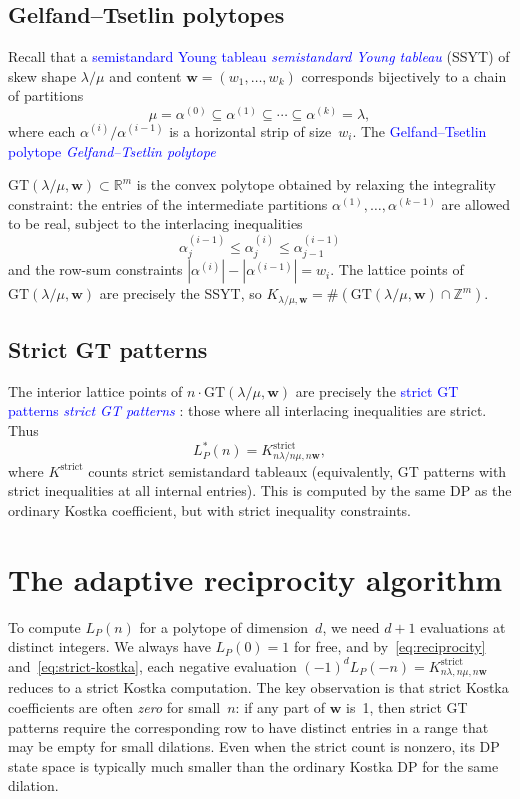 \documentclass[11pt,reqno]{amsart}
\theoremstyle{definition}
\newcommand{\setZ}{\mathbb{Z}}
\newcommand{\setR}{\mathbb{R}}
\newcommand{\GT}{\mathrm{GT}}
\newcommand{\lam}{\lambda}
\newcommand{\wt}{\mathbf{w}}
\newcommand{\Ehr}{L}
\newcommand{\Ehrstar}{L^{*}}
\newcommand{\defin}[1]{%
\relax\ifmmode%
\textcolor{blue}{#1}%
\else \textcolor{blue}{\emph{#1}}%
\fi%
}
\begin{document}
\subsection{Gelfand--Tsetlin polytopes}\label{subs:GTpolytopes}

Recall that a \defin{semistandard Young tableau} (SSYT) of skew shape
$\lam/\mu$ and content $\wt = (w_1, \dotsc, w_k)$ corresponds
bijectively to a chain of partitions
\[
  \mu = \alpha^{(0)} \subseteq \alpha^{(1)} \subseteq \dotsb
  \subseteq \alpha^{(k)} = \lam,
\]
where each $\alpha^{(i)} / \alpha^{(i-1)}$ is a horizontal strip
of size~$w_i$.  The \defin{Gelfand--Tsetlin polytope}
$\GT(\lam/\mu, \wt) \subset \setR^m$ is the convex polytope obtained
by relaxing the integrality constraint: the entries of the
intermediate partitions $\alpha^{(1)}, \dotsc, \alpha^{(k-1)}$ are
allowed to be real, subject to the interlacing inequalities
\[
  \alpha^{(i-1)}_j \leq \alpha^{(i)}_j \leq \alpha^{(i-1)}_{j-1}
\]
and the row-sum constraints
$|\alpha^{(i)}| - |\alpha^{(i-1)}| = w_i$.
The lattice points of $\GT(\lam/\mu, \wt)$ are precisely the SSYT,
so $K_{\lam/\mu, \wt} = \#(\GT(\lam/\mu, \wt) \cap \setZ^m)$.

\subsection{Strict GT patterns}\label{subs:strictGT}

The interior lattice points of $n \cdot \GT(\lam/\mu, \wt)$ are
precisely the \defin{strict GT patterns}: those where all interlacing
inequalities are strict.  Thus
\begin{equation}\label{eq:strict-kostka}
  \Ehrstar_P(n) = K^{\mathrm{strict}}_{n\lam/n\mu, n\wt},
\end{equation}
where $K^{\mathrm{strict}}$ counts strict semistandard tableaux
(equivalently, GT patterns with strict inequalities at all internal
entries).  This is computed by the same DP as the ordinary Kostka
coefficient, but with strict inequality constraints.


\section{The adaptive reciprocity algorithm}\label{sec:algorithm}

To compute $\Ehr_P(n)$ for a polytope of dimension~$d$, we need $d+1$
evaluations at distinct integers.  We always have $\Ehr_P(0) = 1$
for free, and by~\eqref{eq:reciprocity} and~\eqref{eq:strict-kostka},
each negative evaluation $(-1)^d \Ehr_P(-n) = K^{\mathrm{strict}}_{n\lam, n\mu, n\wt}$
reduces to a strict Kostka computation.  The key observation is that
strict Kostka coefficients are often \emph{zero} for small~$n$:
if any part of $\wt$ is~1, then strict GT patterns require the
corresponding row to have distinct entries in a range that may be
empty for small dilations.  Even when the strict count is nonzero,
its DP state space is typically much smaller than the ordinary
Kostka DP for the same dilation.
\end{document}
